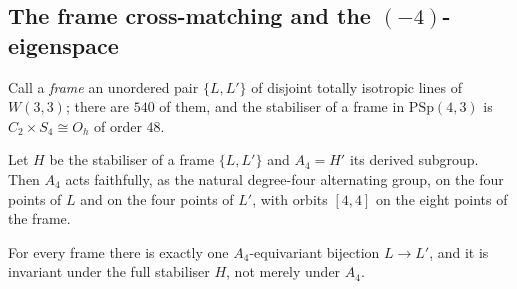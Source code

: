%
%

\makeatletter
{}
\makeatother
\providecommand{\PSp}{\mathrm{PSp}}
\providecommand{\PGSp}{\mathrm{PGSp}}
\providecommand{\Aut}{\mathrm{Aut}}

\subsection*{The frame cross-matching and the \texorpdfstring{$(-4)$}{(-4)}-eigenspace}

Call a \emph{frame} an unordered pair $\{L,L'\}$ of disjoint totally isotropic
lines of $W(3,3)$; there are $540$ of them, and the stabiliser of a frame in
$\PSp(4,3)$ is $C_2\times S_4\cong O_h$ of order $48$.

\begin{lemma}\label{lem:frameA4}
Let $H$ be the stabiliser of a frame $\{L,L'\}$ and $A_4=H'$ its derived
subgroup. Then $A_4$ acts faithfully, as the natural degree-four alternating
group, on the four points of $L$ and on the four points of $L'$, with orbits
$[4,4]$ on the eight points of the frame.
\end{lemma}

\begin{proposition}\label{prop:crossmatching}
For every frame there is exactly one $A_4$-equivariant bijection $L\to L'$, and
it is invariant under the full stabiliser $H$, not merely under $A_4$.
\end{proposition}

